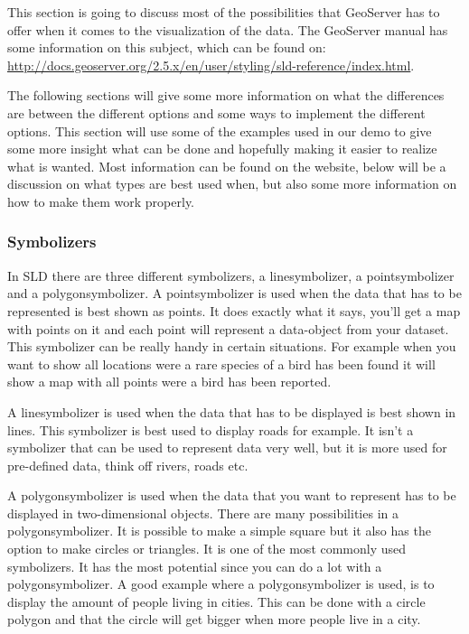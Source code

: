 This section is going to discuss most of the possibilities that GeoServer has to offer when it comes to the visualization of the data. The GeoServer manual has some information on this subject, which can be found on: \url{http://docs.geoserver.org/2.5.x/en/user/styling/sld-reference/index.html}.

The following sections will give some more information on what the differences are between the different options and some ways to implement the different options. This section will use some of the examples used in our demo to give some more insight what can be done and hopefully making it easier to realize what is wanted. Most information can be found on the website, below will be a discussion on what types are best used when, but also some more information on how to make them work properly.

\subsubsection{Symbolizers}

In SLD there are three different symbolizers, a linesymbolizer, a pointsymbolizer and a polygonsymbolizer. A pointsymbolizer is used when the data that has to be represented is best shown as points. It does exactly what it says, you'll get a map with points on it and each point will represent a data-object from your dataset. This symbolizer can be really handy in certain situations. For example when you want to show all locations were a rare species of a bird has been found it will show a map with all points were a bird has been reported.

A linesymbolizer is used when the data that has to be displayed is best shown in lines. This symbolizer is best used to display roads for example. It isn't a symbolizer that can be used to represent data very well, but it is more used for pre-defined data, think off rivers, roads etc.

A polygonsymbolizer is used when the data that you want to represent has to be displayed in two-dimensional objects. There are many possibilities in a polygonsymbolizer. It is possible to make a simple square but it also has the option to make circles or triangles. It is one of the most commonly used symbolizers. It has the most potential since you can do a lot with a polygonsymbolizer. A good example where a polygonsymbolizer is used, is to display the amount of people living in cities. This can be done with a circle polygon and that the circle will get bigger when more people live in a city.

